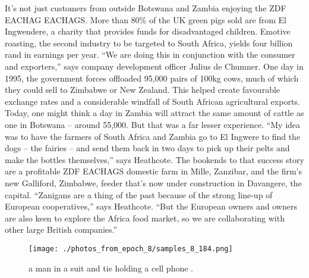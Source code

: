 \documentclass{article}%
\begin{document}
It’s not just customers from outside Botswana and Zambia enjoying the ZDF EACHAG EACHAGS. More than 80\% of the UK green pigs sold are from El Ingwendere, a charity that provides funds for disadvantaged children. Emotive roasting, the second industry to be targeted to South Africa, yields four billion rand in earnings per year.\newline%
“We are doing this in conjunction with the consumer and exporters,” says company development officer Julius de Chumner.\newline%
One day in 1995, the government forces offloaded 95,000 pairs of 100kg cows, much of which they could sell to Zimbabwe or New Zealand. This helped create favourable exchange rates and a considerable windfall of South African agricultural exports. Today, one might think a day in Zambia will attract the same amount of cattle as one in Botswana – around 55,000. But that was a far lesser experience.\newline%
“My idea was to have the farmers of South Africa and Zambia go to El Ingwere to find the dogs – the fairies – and send them back in two days to pick up their pelts and make the bottles themselves,” says Heathcote.\newline%
The bookends to that success story are a profitable ZDF EACHAGS domestic farm in Mille, Zanzibar, and the firm’s new Galliford, Zimbabwe, feeder that’s now under construction in Davangere, the capital. “Zanigans are a thing of the past because of the strong line{-}up of European cooperatives,” says Heathcote. “But the European owners and owners are also keen to explore the Africa food market, so we are collaborating with other large British companies.”\newline%

%


\begin{figure}[h!]%
\centering%
\texttt{[image: ./photos\_from\_epoch\_8/samples\_8\_184.png]}%
\caption{a man in a suit and tie holding a cell phone .}%
\end{figure}

%
\end{document}
